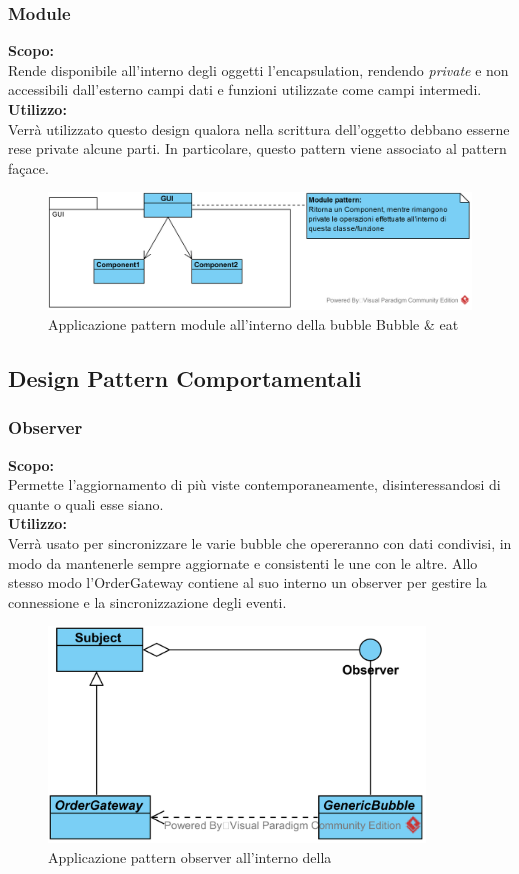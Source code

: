 \subsubsection{Module}
\textbf{Scopo:} \\
Rende disponibile all'interno degli oggetti l'encapsulation, rendendo \textit{private} e non accessibili dall'esterno campi dati e funzioni utilizzate come campi intermedi.\\
\textbf{Utilizzo:} \\
Verrà utilizzato questo design qualora nella scrittura dell'oggetto debbano esserne rese private alcune parti. In particolare, questo pattern viene associato al pattern fa\c{c}ace.
\begin{figure}[H]
	\centering
	\includegraphics[width=15cm]{./diagrammi_img/applicazione_pattern/module_framework.png}
	\caption{Applicazione pattern module all'interno della bubble Bubble \& eat}
\end{figure}

\subsection{Design Pattern Comportamentali}

\subsubsection{Observer}
\textbf{Scopo:} \\
Permette l'aggiornamento di più viste contemporaneamente, disinteressandosi di quante o quali esse siano.\\
\textbf{Utilizzo:} \\
Verrà usato per sincronizzare le varie bubble che opereranno con dati condivisi, in modo da mantenerle sempre aggiornate e consistenti le une con le altre. Allo stesso modo l'OrderGateway contiene al suo interno un observer per gestire la connessione e la sincronizzazione degli eventi.
\begin{figure}[H]
	\centering
	\includegraphics[width=10cm]{./diagrammi_img/applicazione_pattern/observer_demo.png}
	\caption{Applicazione pattern observer all'interno della \DemoName}
\end{figure}

